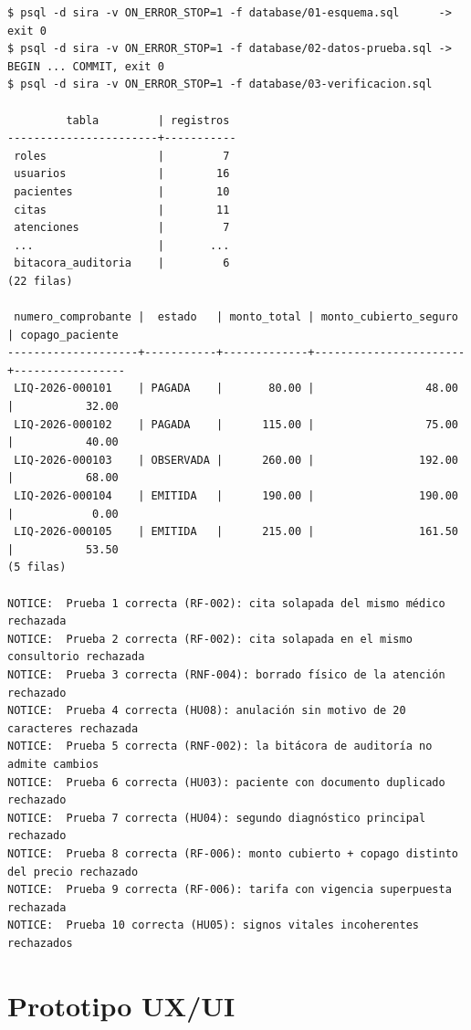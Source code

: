 \documentclass[11pt,a4paper]{article}
\begin{document}
\begin{lstlisting}[style=consola, caption={Salida de la ejecución de los scripts (PostgreSQL 17.6, compatible con la versión 16)}, label={lst:ejecucion}]
$ psql -d sira -v ON_ERROR_STOP=1 -f database/01-esquema.sql      -> exit 0
$ psql -d sira -v ON_ERROR_STOP=1 -f database/02-datos-prueba.sql -> BEGIN ... COMMIT, exit 0
$ psql -d sira -v ON_ERROR_STOP=1 -f database/03-verificacion.sql

         tabla         | registros
-----------------------+-----------
 roles                 |         7
 usuarios              |        16
 pacientes             |        10
 citas                 |        11
 atenciones            |         7
 ...                   |       ...
 bitacora_auditoria    |         6
(22 filas)

 numero_comprobante |  estado   | monto_total | monto_cubierto_seguro | copago_paciente
--------------------+-----------+-------------+-----------------------+-----------------
 LIQ-2026-000101    | PAGADA    |       80.00 |                 48.00 |           32.00
 LIQ-2026-000102    | PAGADA    |      115.00 |                 75.00 |           40.00
 LIQ-2026-000103    | OBSERVADA |      260.00 |                192.00 |           68.00
 LIQ-2026-000104    | EMITIDA   |      190.00 |                190.00 |            0.00
 LIQ-2026-000105    | EMITIDA   |      215.00 |                161.50 |           53.50
(5 filas)

NOTICE:  Prueba 1 correcta (RF-002): cita solapada del mismo médico rechazada
NOTICE:  Prueba 2 correcta (RF-002): cita solapada en el mismo consultorio rechazada
NOTICE:  Prueba 3 correcta (RNF-004): borrado físico de la atención rechazado
NOTICE:  Prueba 4 correcta (HU08): anulación sin motivo de 20 caracteres rechazada
NOTICE:  Prueba 5 correcta (RNF-002): la bitácora de auditoría no admite cambios
NOTICE:  Prueba 6 correcta (HU03): paciente con documento duplicado rechazado
NOTICE:  Prueba 7 correcta (HU04): segundo diagnóstico principal rechazado
NOTICE:  Prueba 8 correcta (RF-006): monto cubierto + copago distinto del precio rechazado
NOTICE:  Prueba 9 correcta (RF-006): tarifa con vigencia superpuesta rechazada
NOTICE:  Prueba 10 correcta (HU05): signos vitales incoherentes rechazados
\end{lstlisting}

\newpage
\section{Prototipo UX/UI}\label{sec:prototipo}
\end{document}
